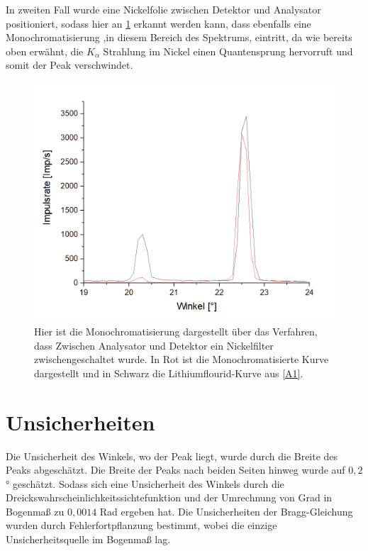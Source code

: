 \documentclass[
	a4paper,
	12pt,
	pagesize,
	ngerman
]{scrartcl}
\begin{document}
In zweiten Fall wurde eine Nickelfolie zwischen Detektor und Analysator positioniert, sodass hier an \cref{A7} erkannt werden kann, dass ebenfalls eine Monochromatisierung ,in diesem Bereich des Spektrums, eintritt, da wie bereits oben erwähnt, die $K_{\alpha}$ Strahlung im Nickel einen Quantensprung hervorruft und somit der Peak verschwindet.
\begin{figure}[h!]
    \centering
    \includegraphics[scale = 0.6]{abs-mono.png}
    \caption{Hier ist die Monochromatisierung dargestellt über das Verfahren, dass Zwischen Analysator und Detektor ein Nickelfilter zwischengeschaltet wurde. In Rot ist die Monochromatisierte Kurve dargestellt und in Schwarz die Lithiumflourid-Kurve aus \cref{A1}.}
    \label{A7}
\end{figure}

\section{Unsicherheiten}
Die Unsicherheit des Winkels, wo der Peak liegt, wurde durch die Breite des Peaks abgeschätzt. Die Breite der Peaks nach beiden Seiten hinweg wurde auf $0,2$° geschätzt. Sodass sich eine Unsicherheit des Winkels durch die Dreickswahrscheinlichkeitssichtefunktion und der Umrechnung von Grad in Bogenmaß zu $0,0014$ Rad ergeben hat.
Die Unsicherheiten der Bragg-Gleichung wurden durch Fehlerfortpflanzung bestimmt, wobei die einzige Unsicherheitsquelle im Bogenmaß lag.
\end{document}

